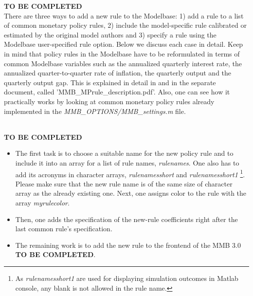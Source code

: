 \textbf{TO BE COMPLETED}\\
\vspace{0.5cm}
%
There are three ways to add a new rule to the Modelbase: 1) add a rule to a list of common monetary policy rules, 2) include the model-specific rule calibrated or estimated by the original model authors and 3) specify a rule using the Modelbase user-specified rule option. Below we discuss each case in detail. Keep in mind that policy rules in the Modelbase have to be reformulated in terms of common Modelbase variables such as the annualized quarterly interest rate, the annualized quarter-to-quarter rate of inflation, the quarterly output and the quarterly output gap. This is explained in detail in \cite{WCMSW2012} and in the separate document, called 'MMB\_MPrule\_description.pdf'. Also, one can see how it practically works by looking at common monetary policy rules already implemented in the \emph{MMB\_OPTIONS/MMB\_settings.m} file.
\newline


\\
\textbf{TO BE COMPLETED}
\begin{itemize}
  \item The first task is to choose a suitable name for the new policy rule and to include it into an array for a list of rule names, \emph{rulenames}. One also has to add its acronyms in character arrays, \emph{rulenamesshort} and \emph{rulenamesshort1} \footnote{ As \emph{rulenamesshort1} are used for displaying simulation outcomes in Matlab console, any blank is not allowed in the rule name.}. Please make sure that the new rule name is of the same size of character array as the already existing one. Next, one assigns color to the rule with the array \textit{myrulecolor}.
	\item Then, one adds the specification of the new-rule coefficients right after the last common rule's specification.
  \item The remaining work is to add the new rule to the frontend of the MMB 3.0 \\\textbf{TO BE COMPLETED}.
\end{itemize}



